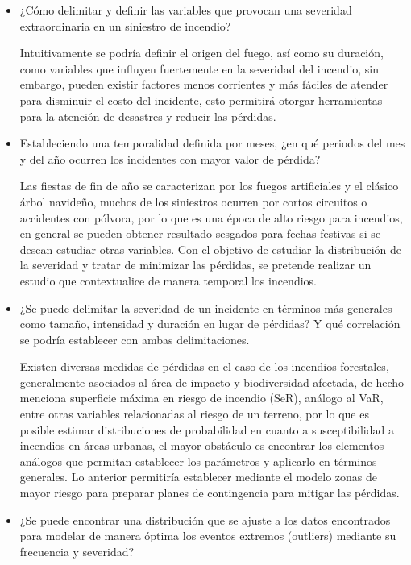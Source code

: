 \documentclass[
  oneside]{memoir}
\begin{document}
\begin{itemize}
  \item ¿Cómo delimitar y definir las variables que provocan una severidad extraordinaria en un siniestro de incendio?
  
  Intuitivamente se podría definir el origen del fuego, así como su duración, como variables que influyen fuertemente en la severidad del incendio, sin embargo, pueden existir factores menos corrientes y más fáciles de atender para disminuir el costo del incidente, esto permitirá otorgar herramientas para la atención de desastres y reducir las pérdidas.
  
  \item Estableciendo una temporalidad definida por meses, ¿en qué periodos del mes y del año ocurren los incidentes con mayor valor de pérdida?
  
  Las fiestas de fin de año se caracterizan por los fuegos artificiales y el clásico árbol navideño, muchos de los siniestros ocurren por cortos circuitos o accidentes con pólvora, por lo que es una época de alto riesgo para incendios, en general se pueden obtener resultado sesgados para fechas festivas si se desean estudiar otras variables. Con el objetivo de estudiar la distribución de la severidad y tratar de minimizar las pérdidas, se pretende realizar un estudio que contextualice de manera temporal los incendios.
  
  \item ¿Se puede delimitar la severidad de un incidente en términos más generales como tamaño, intensidad y duración en lugar de pérdidas? Y qué correlación se podría establecer con ambas delimitaciones.
  
  Existen diversas medidas de pérdidas en el caso de los incendios forestales, generalmente asociados al área de impacto y biodiversidad afectada, de hecho \citet{rojo} menciona superficie máxima en riesgo de incendio (SeR), análogo al VaR, entre otras variables relacionadas al riesgo de un terreno, por lo que es posible estimar distribuciones de probabilidad en cuanto a susceptibilidad a incendios en áreas urbanas, el mayor obstáculo es encontrar los elementos análogos que permitan establecer los parámetros y aplicarlo en términos generales. Lo anterior permitiría establecer mediante el modelo zonas de mayor riesgo para preparar planes de contingencia para mitigar las pérdidas.
  
  
  \item ¿Se puede encontrar una distribución que se ajuste a los datos encontrados para modelar de manera óptima los eventos extremos (outliers) mediante su frecuencia y severidad?
  

\end{itemize}
\end{document}
